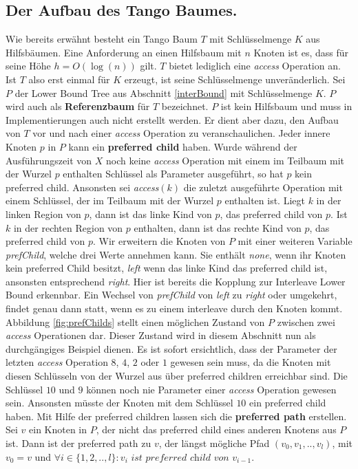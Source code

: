 \documentclass[a4paper,12pt]{article}
\begin{document}
\subsection{Der Aufbau des Tango Baumes.} \label{aufbauDesTango}
Wie bereits erwähnt besteht ein Tango Baum $T$ mit Schlüsselmenge $K$ aus Hilfsbäumen. Eine Anforderung an einen Hilfsbaum mit $n$ Knoten ist es, dass für seine Höhe $h = O\left(\log\left( n\right)\right)$ gilt. $T$ bietet lediglich eine \textit{access} Operation an. Ist $T$ also erst einmal für $K$ erzeugt, ist seine Schlüsselmenge unveränderlich. Sei $P$ der Lower Bound Tree aus Abschnitt \ref{interBound} mit Schlüsselmenge $K$. $P$ wird auch als \textbf{Referenzbaum} für $T$ bezeichnet. $P$ ist kein Hilfsbaum und muss in Implementierungen auch nicht erstellt werden. Er dient aber dazu, den Aufbau von $T$ vor und nach einer \textit{access} Operation zu veranschaulichen. Jeder innere Knoten $p$ in $P$ kann ein \textbf{preferred child} haben.  Wurde während der Ausführungszeit von $X$ noch keine \textit{access} Operation mit einem im Teilbaum mit der Wurzel $p$ enthalten Schlüssel als Parameter ausgeführt, so hat $p$ kein preferred child. Ansonsten sei \textit{access}$\left(k\right)$ die zuletzt ausgeführte Operation mit einem Schlüssel, der im Teilbaum mit der Wurzel $p$ enthalten ist. Liegt $k$ in der linken Region von $p$, dann ist das linke Kind von $p$, das preferred child von $p$. Ist $k$ in der rechten Region von $p$ enthalten, dann ist das rechte Kind von $p$, das preferred child von $p$. Wir erweitern die Knoten von $P$ mit einer weiteren Variable \textit{prefChild}, welche drei Werte annehmen kann. Sie enthält \textit{none}, wenn ihr Knoten kein preferred Child besitzt, \textit{left} wenn das linke Kind das preferred child ist, ansonsten entsprechend \textit{right}. Hier ist bereits die Kopplung zur Interleave Lower Bound erkennbar. Ein Wechsel von \textit{prefChild}  von \textit{left} zu \textit{right} oder umgekehrt, findet genau dann statt, wenn es zu einem interleave durch den Knoten kommt. Abbildung \ref{fig:prefChilds} stellt einen möglichen Zustand von $P$ zwischen zwei \textit{access} Operationen dar. Dieser Zustand wird in diesem Abschnitt nun als durchgängiges Beispiel dienen. Es ist sofort ersichtlich, dass der Parameter der letzten \textit{access} Operation $8$, $4$, $2$ oder $1$ gewesen sein muss, da die Knoten mit diesen Schlüsseln von der Wurzel aus über preferred children erreichbar sind. Die Schlüssel $10$ und $9$ können noch nie Parameter einer \textit{access} Operation gewesen sein. Ansonsten müsste der Knoten mit dem Schlüssel $10$ ein preferred child haben. Mit Hilfe der preferred children lassen sich die \textbf{preferred path} erstellen. Sei $v$ ein Knoten in $P$, der nicht das preferred child eines anderen Knotens aus $P$ ist. Dann ist der preferred path zu $v$, der längst mögliche Pfad $\left(v_0, v_1,..,v_l\right)$, mit $v_0 = v$ und $\forall i \in \{1,2,..,l\} \colon v_i \textit{ ist preferred child von }v_{i-1   }$.  
\end{document}
